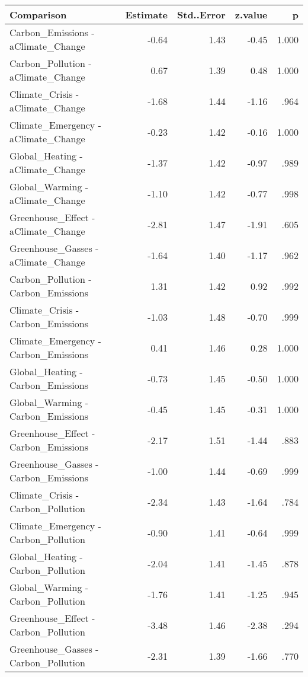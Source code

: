 \begin{table}[ht]
\centering
\begin{tabular}{lrrrr}
  \hline
Comparison & Estimate & Std..Error & z.value & p \\ 
  \hline
Carbon\_Emissions - aClimate\_Change & -0.64 & 1.43 & -0.45 & 1.000 \\ 
  Carbon\_Pollution - aClimate\_Change & 0.67 & 1.39 & 0.48 & 1.000 \\ 
  Climate\_Crisis - aClimate\_Change & -1.68 & 1.44 & -1.16 & .964 \\ 
  Climate\_Emergency - aClimate\_Change & -0.23 & 1.42 & -0.16 & 1.000 \\ 
  Global\_Heating - aClimate\_Change & -1.37 & 1.42 & -0.97 & .989 \\ 
  Global\_Warming - aClimate\_Change & -1.10 & 1.42 & -0.77 & .998 \\ 
  Greenhouse\_Effect - aClimate\_Change & -2.81 & 1.47 & -1.91 & .605 \\ 
  Greenhouse\_Gasses - aClimate\_Change & -1.64 & 1.40 & -1.17 & .962 \\ 
  Carbon\_Pollution - Carbon\_Emissions & 1.31 & 1.42 & 0.92 & .992 \\ 
  Climate\_Crisis - Carbon\_Emissions & -1.03 & 1.48 & -0.70 & .999 \\ 
  Climate\_Emergency - Carbon\_Emissions & 0.41 & 1.46 & 0.28 & 1.000 \\ 
  Global\_Heating - Carbon\_Emissions & -0.73 & 1.45 & -0.50 & 1.000 \\ 
  Global\_Warming - Carbon\_Emissions & -0.45 & 1.45 & -0.31 & 1.000 \\ 
  Greenhouse\_Effect - Carbon\_Emissions & -2.17 & 1.51 & -1.44 & .883 \\ 
  Greenhouse\_Gasses - Carbon\_Emissions & -1.00 & 1.44 & -0.69 & .999 \\ 
  Climate\_Crisis - Carbon\_Pollution & -2.34 & 1.43 & -1.64 & .784 \\ 
  Climate\_Emergency - Carbon\_Pollution & -0.90 & 1.41 & -0.64 & .999 \\ 
  Global\_Heating - Carbon\_Pollution & -2.04 & 1.41 & -1.45 & .878 \\ 
  Global\_Warming - Carbon\_Pollution & -1.76 & 1.41 & -1.25 & .945 \\ 
  Greenhouse\_Effect - Carbon\_Pollution & -3.48 & 1.46 & -2.38 & .294 \\ 
  Greenhouse\_Gasses - Carbon\_Pollution & -2.31 & 1.39 & -1.66 & .770 \\ 

\end{tabular}
\end{table}
